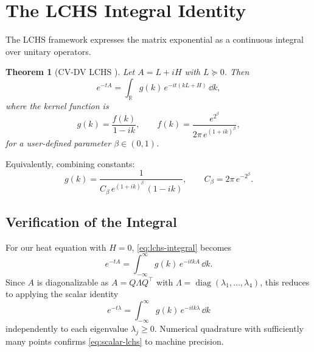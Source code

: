\documentclass[11pt]{article}
\newtheorem{theorem}{Theorem}
\begin{document}
\section{The LCHS Integral Identity}

The LCHS framework expresses the matrix exponential as a continuous integral
over unitary operators.

\begin{theorem}[CV-DV LCHS {\cite[Thm.~1]{das2025}}]\label{thm:lchs}
Let $A = L + iH$ with $L \succeq 0$.  Then
\begin{equation}\label{eq:lchs-integral}
  e^{-tA} = \int_{\mathbb{R}} g(k)\, e^{-it(kL + H)}\,\dd{k},
\end{equation}
where the kernel function is
\begin{equation}\label{eq:kernel}
  g(k) = \frac{f(k)}{1-ik}, \qquad
  f(k) = \frac{e^{2^\beta}}{2\pi\, e^{(1+ik)^\beta}},
\end{equation}
for a user-defined parameter $\beta \in (0,1)$.
\end{theorem}

Equivalently, combining constants:
\begin{equation}\label{eq:g-combined}
  g(k) = \frac{1}{C_\beta\, e^{(1+ik)^\beta}\,(1-ik)},
  \qquad C_\beta = 2\pi\, e^{-2^\beta}.
\end{equation}

\subsection{Verification of the Integral}

For our heat equation with $H=0$, \cref{eq:lchs-integral} becomes
\begin{equation}\label{eq:lchs-heat}
  e^{-tA} = \int_{-\infty}^{\infty} g(k)\, e^{-itkA}\,\dd{k}.
\end{equation}
Since $A$ is diagonalizable as $A = Q\Lambda Q^\top$ with
$\Lambda = \operatorname{diag}(\lambda_1,\ldots,\lambda_4)$, this reduces to
applying the scalar identity
\begin{equation}\label{eq:scalar-lchs}
  e^{-t\lambda} = \int_{-\infty}^{\infty} g(k)\, e^{-itk\lambda}\,\dd{k}
\end{equation}
independently to each eigenvalue $\lambda_j \geq 0$.
Numerical quadrature with sufficiently many points confirms
\cref{eq:scalar-lchs} to machine precision.
\end{document}
